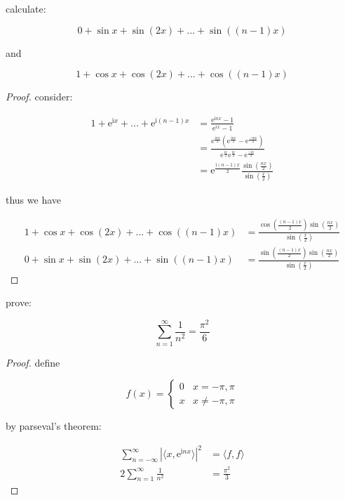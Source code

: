 \begin{exercise}
    calculate:

    \[
        0 + \sin x + \sin (2x) + ... + \sin ((n-1) x)
    \]

    and

    \[
        1 + \cos x + \cos (2x) + ... + \cos ((n-1) x) 
    \]
\end{exercise}

\begin{proof}
    consider:
    
    \begin{align*}
        1 + \mathrm{e}^{\mathrm{i}x} + ... + \mathrm{e}^{\mathrm{i}(n-1)x} &= \frac{\mathrm{e}^{\mathrm{i}nx} - 1}{\mathrm{e}^{ix} - 1} \\
        &= \frac{\mathrm{e}^{\frac{\mathrm{i}nx}{2}} \left( \mathrm{e}^{\frac{\mathrm{i}nx}{2}} - \mathrm{e}^{\frac{-\mathrm{i}nx}{2}}\right)}{\mathrm{e}^{\frac{\mathrm{i}x}{2}}\mathrm{e}^{\frac{\mathrm{i}x}{2}} - \mathrm{e}^{\frac{-\mathrm{i}x}{2}}} \\
        &= \mathrm{e}^{\frac{\mathrm{i}(n-1)x}{2}} \frac{\sin (\frac{nx}{2})}{\sin(\frac{x}{2})}
    \end{align*}

    thus we have

    \begin{align*}
        1 + \cos x + \cos (2x) + ... + \cos ((n-1) x)  &=  \frac{\cos (\frac{(n-1)x}{2}) \sin (\frac{nx}{2})}{\sin(\frac{x}{2})} \\
        0 + \sin x + \sin (2x) + ... + \sin ((n-1) x) &= \frac{\sin (\frac{(n-1)x}{2}) \sin (\frac{nx}{2})}{\sin(\frac{x}{2})}
    \end{align*}
\end{proof}

\begin{exercise}
    prove:

    \[
        \sum_{n=1}^{\infty} \frac{1}{n^2} = \frac{\pi^2}{6}
    \]
\end{exercise}

\begin{proof}
    define 

    \[
        f(x) = \begin{cases}
            0 & x = -\pi, \pi \\
            x & x \ne -\pi, \pi
        \end{cases}
    \]

    by parseval's theorem:

    \begin{align*}
        \sum_{n=-\infty}^{\infty} \left|\langle x, \mathrm{e}^{\mathrm{i}nx}\rangle \right|^2 &= \langle f, f \rangle \\
        2\sum_{n=1}^{\infty} \frac{1}{n^2}  &= \frac{\pi^2}{3}
    \end{align*}
\end{proof}